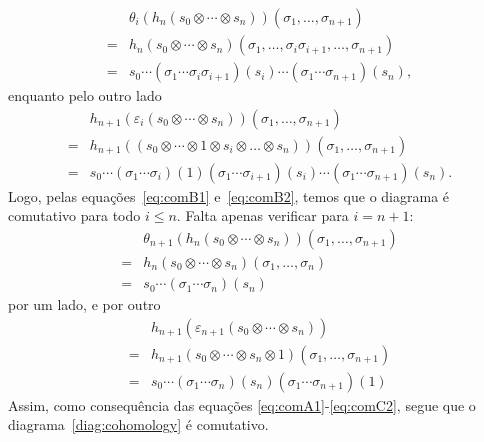 \begin{equation} \label{eq:comB1} \begin{array}{rl}
    & \theta_i(h_n(s_0\otimes\cdots\otimes s_n))(\sigma_1,\dots,\sigma_{n+1}) \\
    =& h_n(s_0\otimes\cdots\otimes s_n)(\sigma_1,\dots,\sigma_{i}\sigma_{i+1},\dots,\sigma_{n+1}) \\
    =& s_0\cdots(\sigma_1\cdots\sigma_i\sigma_{i+1})(s_i)\cdots(\sigma_1\cdots\sigma_{n+1})(s_n),
\end{array}\end{equation}
enquanto pelo outro lado
\begin{equation} \label{eq:comB2} \begin{array}{rl}
    & h_{n+1}(\varepsilon_i(s_0\otimes\cdots\otimes s_n))(\sigma_1,\dots,\sigma_{n+1})  \\
    =& h_{n+1}((s_0\otimes\cdots\otimes1\otimes s_i\otimes \dots \otimes s_n))(\sigma_1,\dots,\sigma_{n+1}) \\
    =& s_0\cdots (\sigma_1\cdots\sigma_i)(1) (\sigma_1\cdots\sigma_{i+1})(s_i)\cdots(\sigma_1\cdots\sigma_{n+1})(s_n).
\end{array}\end{equation}
Logo, pelas equações~\eqref{eq:comB1} e~\eqref{eq:comB2}, temos que o diagrama é comutativo para todo $i \leq n$. Falta apenas verificar para $i=n+1$:
\begin{equation} \label{eq:comC1} \begin{array}{rl}
    & \theta_{n+1}(h_n(s_0\otimes\cdots\otimes s_n))(\sigma_1,\dots,\sigma_{n+1}) \\
    =& h_n(s_0\otimes \cdots\otimes s_n)(\sigma_1,\dots,\sigma_n) \\
    =& s_0\cdots(\sigma_1\cdots\sigma_n)(s_n)
\end{array}\end{equation}
por um lado, e por outro
\begin{equation} \label{eq:comC2}\begin{array}{rl}
    & h_{n+1}(\varepsilon_{n+1}(s_0\otimes\cdots\otimes s_n)) \\
    =& h_{n+1}(s_0\otimes\cdots\otimes s_n \otimes 1)(\sigma_1,\dots,\sigma_{n+1}) \\
    =& s_0 \cdots(\sigma_1\cdots\sigma_n)(s_n)(\sigma_1\cdots\sigma_{n+1})(1)
\end{array}\end{equation}
Assim, como consequência das equações \eqref{eq:comA1}-\eqref{eq:comC2}, segue que o diagrama~\eqref{diag:cohomology} é comutativo. \par 
